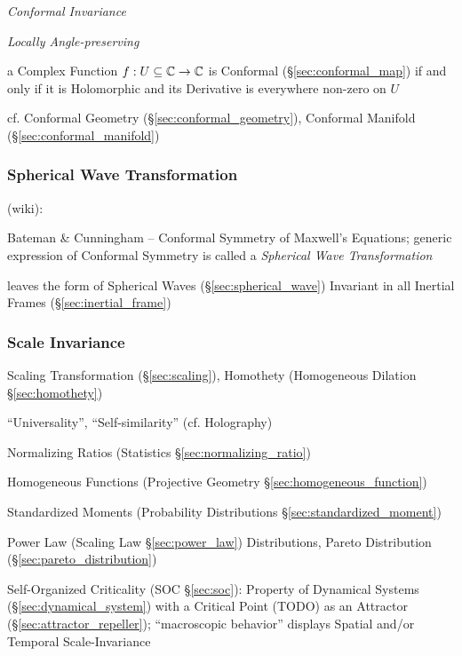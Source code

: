 \emph{Conformal Invariance}

\emph{Locally Angle-preserving}

a Complex Function $f : U \subseteq \mathbb{C} \to \mathbb{C}$ is Conformal
(\S\ref{sec:conformal_map}) if and only if it is Holomorphic and its Derivative
is everywhere non-zero on $U$

cf. Conformal Geometry (\S\ref{sec:conformal_geometry}),
Conformal Manifold (\S\ref{sec:conformal_manifold})



\subsubsection{Spherical Wave Transformation}
\label{sec:spherical_wave_transformation}

(wiki):

Bateman \& Cunningham -- Conformal Symmetry of Maxwell's Equations; generic
expression of Conformal Symmetry is called a \emph{Spherical Wave
  Transformation}

leaves the form of Spherical Waves (\S\ref{sec:spherical_wave}) Invariant in
all Inertial Frames (\S\ref{sec:inertial_frame})



\subsubsection{Scale Invariance}\label{sec:scale_invariance}

Scaling Transformation (\S\ref{sec:scaling}), Homothety (Homogeneous Dilation
\S\ref{sec:homothety})

``Universality'', ``Self-similarity'' (cf. Holography)

\fist Normalizing Ratios (Statistics \S\ref{sec:normalizing_ratio})

\fist Homogeneous Functions (Projective Geometry
\S\ref{sec:homogeneous_function})

\fist Standardized Moments (Probability Distributions
\S\ref{sec:standardized_moment})

Power Law (Scaling Law \S\ref{sec:power_law}) Distributions, Pareto Distribution
(\S\ref{sec:pareto_distribution})

Self-Organized Criticality (SOC \S\ref{sec:soc}): Property of Dynamical Systems
(\S\ref{sec:dynamical_system}) with a Critical Point (TODO) as an Attractor
(\S\ref{sec:attractor_repeller}); ``macroscopic behavior'' displays Spatial
and/or Temporal Scale-Invariance

